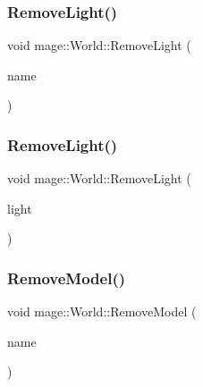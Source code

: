 \subsubsection{\texorpdfstring{Remove\+Light()}{RemoveLight()}\hspace{0.1cm}{\footnotesize\ttfamily [1/2]}}
{\footnotesize\ttfamily void mage\+::\+World\+::\+Remove\+Light (\begin{DoxyParamCaption}\item[{const string \&}]{name }\end{DoxyParamCaption})}

\hypertarget{classmage_1_1_world_ab2bca0a737500b2d78b39e6cbafd61d0}{}\label{classmage_1_1_world_ab2bca0a737500b2d78b39e6cbafd61d0} 
\subsubsection{\texorpdfstring{Remove\+Light()}{RemoveLight()}\hspace{0.1cm}{\footnotesize\ttfamily [2/2]}}
{\footnotesize\ttfamily void mage\+::\+World\+::\+Remove\+Light (\begin{DoxyParamCaption}\item[{\hyperlink{namespacemage_a1e01ae66713838a7a67d30e44c67703e}{Shared\+Ptr}$<$ \hyperlink{classmage_1_1_point_light}{Point\+Light} $>$}]{light }\end{DoxyParamCaption})}

\hypertarget{classmage_1_1_world_aebba267c6c47de1c806ffe49be273dea}{}\label{classmage_1_1_world_aebba267c6c47de1c806ffe49be273dea} 
\subsubsection{\texorpdfstring{Remove\+Model()}{RemoveModel()}\hspace{0.1cm}{\footnotesize\ttfamily [1/2]}}
{\footnotesize\ttfamily void mage\+::\+World\+::\+Remove\+Model (\begin{DoxyParamCaption}\item[{const string \&}]{name }\end{DoxyParamCaption})}

\hypertarget{classmage_1_1_world_afad0c7024fcd304bb582bdc1d281c590}{}\label{classmage_1_1_world_afad0c7024fcd304bb582bdc1d281c590} 
